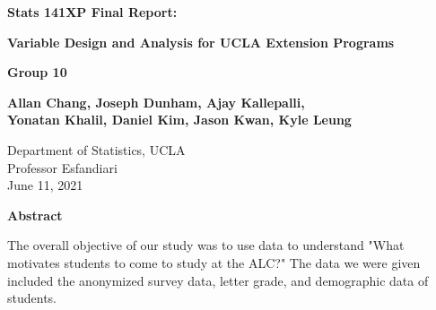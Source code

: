 \documentclass[12pt,letterpaper]{article}
\begin{document}
\begin{titlepage}
   \begin{center}
       \vspace*{.5cm}

       \textbf{Stats 141XP Final Report:}

       \vspace{.1cm}
        \textbf{Variable Design and Analysis for UCLA Extension Programs}
            
    \textbf{Group 10}
    
       \textbf{Allan Chang, Joseph Dunham, Ajay Kallepalli,\\
       Yonatan Khalil, Daniel Kim, Jason Kwan, Kyle Leung}
       
       
       
       \vspace{1cm}
     
            
       Department of Statistics, UCLA\\
       Professor Esfandiari\\
       June 11, 2021\\
          
          \vspace{1cm}
          {\large\textbf{Abstract}\par}  
   \end{center}

\vspace*{-5mm}

\noindent
The overall objective of our study was to use data to understand "What motivates students to come to study at the ALC?" The data we were given included the anonymized survey data, letter grade, and demographic data of students. 


\end{titlepage}
\end{document}
